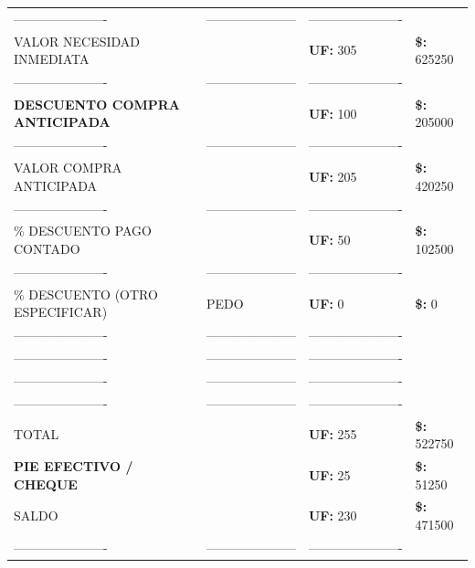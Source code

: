 \documentclass[10pt]{article}
\begin{document}
\begin{tabular}{llll}
\hline
\color{white}---------------------- & \color{white}--------------------- & \color{white}---------------------- \\
VALOR NECESIDAD INMEDIATA &  & \textbf{UF: } 305 & \textbf{\$: }625250 \\ 
\color{white}---------------------- & \color{white}--------------------- & \color{white}---------------------- \\
\textbf{DESCUENTO COMPRA ANTICIPADA} & & \textbf{UF: }100& \textbf{\$: }205000 \\ 
\color{white}---------------------- & \color{white}--------------------- & \color{white}---------------------- \\
VALOR COMPRA ANTICIPADA &  & \textbf{UF: }205& \textbf{\$: }420250 \\  
\color{white}---------------------- & \color{white}--------------------- & \color{white}---------------------- \\
\% DESCUENTO PAGO CONTADO &  & \textbf{UF: }50& \textbf{\$: }102500 \\  
\color{white}---------------------- & \color{white}--------------------- & \color{white}---------------------- \\
\% DESCUENTO (OTRO ESPECIFICAR) &PEDO& \textbf{UF: }0& \textbf{\$: }0 \\  
\color{white}---------------------- & \color{white}--------------------- & \color{white}---------------------- \\
\color{white}---------------------- & \color{white}--------------------- & \color{white}---------------------- \\
\color{white}---------------------- & \color{white}--------------------- & \color{white}---------------------- \\
\color{white}---------------------- & \color{white}--------------------- & \color{white}---------------------- \\
TOTAL &  & \textbf{UF: }255& \textbf{\$: }522750 \\  
\textbf{PIE EFECTIVO / CHEQUE} &  & \textbf{UF: }25& \textbf{\$: }51250 \\   
SALDO &  & \textbf{UF: }230 & \textbf{\$: } 471500 \\  
\color{white}---------------------- & \color{white}--------------------- & \color{white}---------------------- \\
\hline
\end{tabular}
\end{document}
